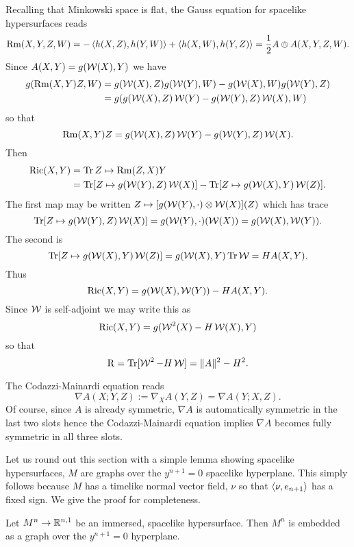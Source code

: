 \documentclass[a4paper, 12pt]{amsart}
\begin{document}
Recalling that Minkowski space is flat, the Gauss equation for spacelike hypersurfaces reads
\[
\Rm(X, Y, Z, W) = -\inpr{h(X, Z)}{h(Y, W)} + \inpr{h(X, W)}{h(Y, Z)} = \frac{1}{2} A \owedge A (X, Y, Z, W).
\]
Since \(A(X, Y) = g(\W(X), Y)\) we have
\begin{align*}
g(\Rm(X, Y) Z, W) &= g(\W(X), Z) g(\W(Y), W) - g(\W(X), W) g(\W(Y), Z) \\
&= g(g(\W(X), Z) \W(Y) - g(\W(Y), Z) \W(X), W)
\end{align*}
so that
\[
\Rm(X, Y) Z = g(\W(X), Z) \W(Y) - g(\W(Y), Z) \W(X).
\]
Then
\[
\begin{split}
\Ric(X, Y) &= \Tr Z \mapsto \Rm(Z, X) Y \\
&= \Tr [Z \mapsto g(\W(Y), Z) \W(X)] - \Tr[Z \mapsto g(\W(X), Y) \W(Z)].
\end{split}
\]
The first map may be written \(Z \mapsto [g(\W(Y), \cdot) \otimes \W(X)] (Z)\) which has trace
\[
\Tr [Z \mapsto g(\W(Y), Z) \W(X)] = g(\W(Y), \cdot) (\W(X)) = g(\W(X), \W(Y)).
\]
The second is
\[
\Tr [Z \mapsto g(\W(X), Y) \W(Z)] = g(\W(X), Y) \Tr \W = H A(X, Y).
\]
Thus
\[
\Ric(X, Y) = g(\W(X),\W(Y)) - H A(X, Y).
\]
Since \(\W\) is self-adjoint we may write this as
\[
\Ric(X, Y) = g(\W^2(X) - H \W(X), Y)
\]
so that
\[
\Sc = \Tr [\W^2 - H\W] = \|A\|^2 - H^2.
\]

The Codazzi-Mainardi equation reads
\begin{equation}
\label{eq:codazzi}
\nabla A (X; Y, Z) := \nabla_X A (Y, Z) = \nabla A(Y; X, Z).
\end{equation}
Of course, since \(A\) is already symmetric, \(\nabla A\) is automatically symmetric in the last two slots hence the Codazzi-Mainardi equation implies \(\nabla A\) becomes fully symmetric in all three slots.

Let us round out this section with a simple lemma showing spacelike hypersurfaces, \(M\) are graphs over the \(y^{n+1} = 0\) spacelike hyperplane. This simply follows because \(M\) has a timelike normal vector field, \(\nu\) so that \(\inpr{\nu}{e_{n+1}}\) has a fixed sign. We give the proof for completeness.

\begin{lemma}
\label{lem:graph}

Let \(M^n \to \R^{n,1}\) be an immersed, spacelike hypersurface. Then \(M^n\) is embedded as a graph over the \(y^{n+1} = 0\) hyperplane.
\end{lemma}
\end{document}
